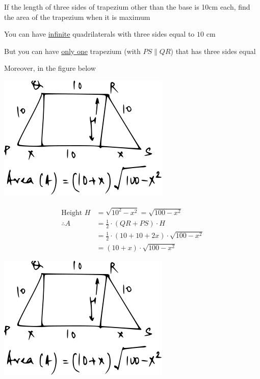 \documentclass[14pt,fleqn]{extarticle}
\begin{document}
If the length of three sides of trapezium 
other than the base is 10cm each, find the 
area of the trapezium when it is maximum
%

\newcard

You can have \underline{infinite} quadrilaterals with
three sides equal to $10$ cm\newline 

But you can have
\underline{only one} trapezium (with $PS\parallel QR$) that has 
three sides equal \newline 

Moreover, in the figure below 
\begin{center} 
\includegraphics[scale=1.5]{figure.svg} 
\end{center} 
\begin{align}
\text{Height } H &= \sqrt{10^2 - x^2} = \sqrt{100-x^2} \\
\therefore A &= \frac{1}{2}\cdot \left(QR + PS \right)\cdot H \\
&= \frac{1}{2}\cdot \left(10 + 10 +2x \right)\cdot \sqrt{100-x^2} \\
&= \left(10+x \right)\cdot \sqrt{100-x^2} 
\end{align}

\newcard

\begin{center} 
\includegraphics[scale=1.5]{img_prefab-2.svg} 
\end{center} 
\end{document}
